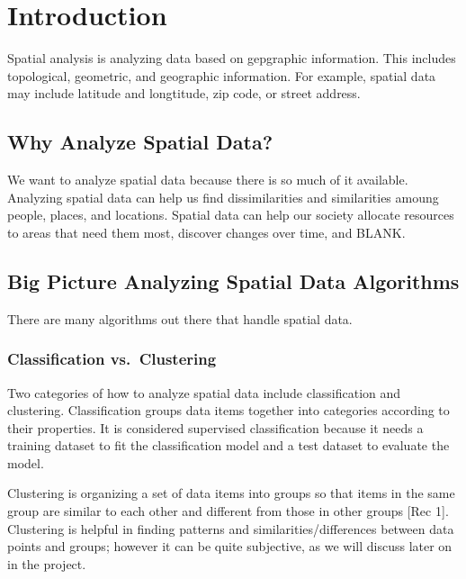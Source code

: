 \documentclass[12pt,twoside]{amherstthesis}
\begin{document}
  \onehalfspacing
  
  \chapter*{Introduction}\label{introduction}
  
  Spatial analysis is analyzing data based on gepgraphic information. This
  includes topological, geometric, and geographic information. For
  example, spatial data may include latitude and longtitude, zip code, or
  street address.
  
  \section{Why Analyze Spatial Data?}\label{why-analyze-spatial-data}
  
  We want to analyze spatial data because there is so much of it
  available. Analyzing spatial data can help us find dissimilarities and
  similarities amoung people, places, and locations. Spatial data can help
  our society allocate resources to areas that need them most, discover
  changes over time, and BLANK.
  
  \section{Big Picture Analyzing Spatial Data
  Algorithms}\label{big-picture-analyzing-spatial-data-algorithms}
  
  There are many algorithms out there that handle spatial data.
  
  \subsection{Classification
  vs.~Clustering}\label{classification-vs.clustering}
  
  Two categories of how to analyze spatial data include classification and
  clustering. Classification groups data items together into categories
  according to their properties. It is considered supervised
  classification because it needs a training dataset to fit the
  classification model and a test dataset to evaluate the model.
  
  Clustering is organizing a set of data items into groups so that items
  in the same group are similar to each other and different from those in
  other groups {[}Rec 1{]}. Clustering is helpful in finding patterns and
  similarities/differences between data points and groups; however it can
  be quite subjective, as we will discuss later on in the project.
  
\end{document}
